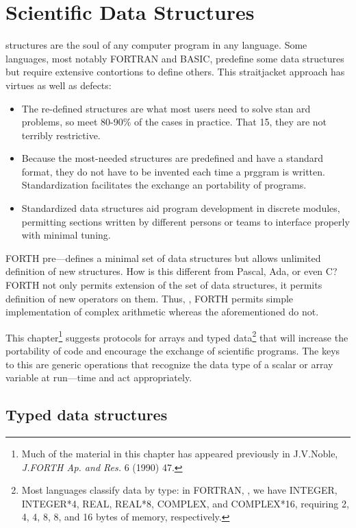 \chapter{Scientific Data Structures}
\startcontents[chapters]

 structures are the soul of any computer program in any language. Some languages, most notably FORTRAN and BASIC, predefine some data structures but require extensive contortions to define others. This straitjacket approach has virtues as well as defects:

\begin{itemize}
    \item The re-defined structures are what most users need to solve stan ard problems, so meet 80-90\% of the cases in practice. That 15, they are not terribly restrictive.
    \item Because the most-needed structures are predefined and have a standard format, they do not have to be invented each time a prggram is written. Standardization facilitates the exchange an portability of programs.
    \item Standardized data structures aid program development in discrete modules, permitting sections written by different persons or teams to interface properly with minimal tuning.
\end{itemize}

FORTH pre—defines a minimal set of data structures but allows unlimited definition of new structures. How is this different from Pascal, Ada, or even C? FORTH not only permits extension of the set of data structures, it permits definition of new operators on them. Thus, \eg, FORTH permits simple implementation of complex arithmetic whereas the aforementioned do not.

This chapter\footnote{Much of the material in this chapter has appeared previously in J.V.Noble, \textit{J.FORTH Ap. and Res.} 6 (1990) 47.} suggests protocols for arrays and typed data\footnote{Most languages classify data by type: in FORTRAN, \eg, we have INTEGER, INTEGER*4, REAL, REAL*8, COMPLEX, and COMPLEX*16, requiring 2, 4, 4, 8, 8, and 16 bytes of memory, respectively.} that will increase the portability of code and encourage the exchange of scientific programs. The keys to this are generic operations that recognize the data type of a scalar or array variable at run—time and act appropriately.

\section{Typed data structures}

